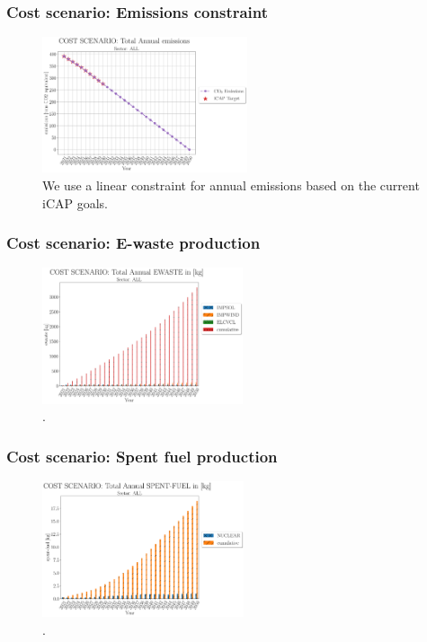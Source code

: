 \begin{frame}
  \frametitle{Cost scenario: Emissions constraint}
  \begin{figure}[htbp!]
    \begin{center}
      \includegraphics[height=4cm]{./images/cost scenario_all_emissions_co2eq.png}
    \end{center}
    \caption{We use a linear constraint for annual emissions based on the current iCAP goals.} 
    \label{fig:cost-emissionsgoal}
  \end{figure}
\end{frame}

\begin{frame}
  \frametitle{Cost scenario: E-waste production}
  \begin{figure}[htbp!]
    \begin{center}
      \includegraphics[height=4cm]{./images/cost scenario_all_emissions_ewaste.png}
    \end{center}
    \caption{.} 
    \label{fig:cost-ewaste}
  \end{figure}
\end{frame}

\begin{frame}
  \frametitle{Cost scenario: Spent fuel production}
  \begin{figure}[htbp!]
    \begin{center}
      \includegraphics[height=4cm]{./images/cost scenario_all_emissions_spent-fuel.png}
    \end{center}
    \caption{.} 
    \label{fig:cost-spentfuel}
  \end{figure}
\end{frame}


